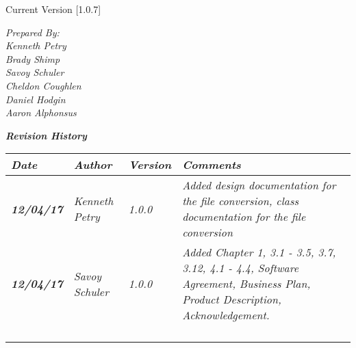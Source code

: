 


Current Version [1.0.7]
\vspace*{5mm}

{\color{SDColor5}
\noindent
\textit{Prepared By:}\\
\textit{Kenneth Petry}\\
\textit{Brady Shimp}\\
\textit{Savoy Schuler}\\
\textit{Cheldon Coughlen}\\
\textit{Daniel Hodgin}\\
\textit{Aaron Alphonsus}
}

\vfill
\noindent
{\color{SDColor3} \textit{\textbf{Revision History}}}\\
\begin{tabular}{|>{\raggedright}p{1.5cm}|>{\raggedright}p{3cm}|>{\raggedright}p{1.5cm}|>{\raggedright}p{9cm}|}
  \hline
  \textit{\textbf{Date}} &  \textit{\textbf{Author}} & \textit{\textbf{Version}} & \textit{\textbf{Comments}}\tabularnewline
  \hline
  \textit{\textbf{12/04/17}} & \textit{Kenneth Petry} & \textit{1.0.0} & \textit{Added design documentation for the file conversion, class documentation for the file conversion}\tabularnewline\hline
  \textit{\textbf{12/04/17}} & \textit{Savoy Schuler} & \textit{1.0.0} & \textit{Added Chapter 1, 3.1 - 3.5, 3.7, 3.12, 4.1 - 4.4, Software Agreement, Business Plan, Product Description, Acknowledgement.}\tabularnewline\hline
  &  &  & \tabularnewline
  \hline
  &  &  & \tabularnewline
  \hline
  &  &  & \tabularnewline
  \hline
  &  &  & \tabularnewline
  \hline
\end{tabular}
\vfill

